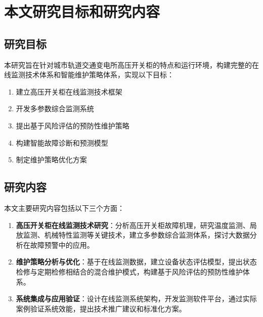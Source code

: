 \section{本文研究目标和研究内容}

\subsection{研究目标}

本研究旨在针对城市轨道交通变电所高压开关柜的特点和运行环境，构建完整的在线监测技术体系和智能维护策略体系，实现以下目标：
\begin{enumerate}
    \item 建立高压开关柜在线监测技术框架
    \item 开发多参数综合监测系统
    \item 提出基于风险评估的预防性维护策略
    \item 构建智能故障诊断和预测模型
    \item 制定维护策略优化方案
\end{enumerate}

\subsection{研究内容}

本文主要研究内容包括以下三个方面：

\begin{enumerate}
    \item \textbf{高压开关柜在线监测技术研究}：分析高压开关柜故障机理，研究温度监测、局放监测、机械特性监测等关键技术，建立多参数综合监测体系，探讨大数据分析在故障预警中的应用。

    \item \textbf{维护策略分析与优化}：基于在线监测数据，建立设备状态评估模型，提出状态检修与定期检修相结合的混合维护模式，构建基于风险评估的预防性维护体系。

    \item \textbf{系统集成与应用验证}：设计在线监测系统架构，开发监测软件平台，通过实际案例验证系统效能，提出技术推广建议和标准化方案。
\end{enumerate}